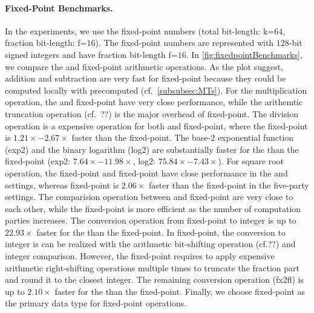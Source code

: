 \paragraph{Fixed-Point Benchmarks.}
\label{para:Fixed-PointBenchmarking}
In the experiments, we use the \booleanGMW fixed-point numbers (total bit-length: k=$64$, fraction bit-length: f=$16$).
The \arithmeticGMW fixed-point numbers are represented with $128$-bit signed integers and have fraction bit-length f=$16$.
In \autoref{fig:fixedpointBenchmarks}, we compare the \booleanGMW and \arithmeticGMW fixed-point arithmetic operations. As the plot suggest, addition and subtraction are very fast for \arithmeticGMW fixed-point because they could be computed locally with precomputed \mts (cf.~\autoref{subsubsec:MTs}). For the multiplication operation, the \booleanGMW and \arithmeticGMW fixed-point have very close performance, while the arithemtic truncation operation (cf.~??) is the major overhead of \arithmeticGMW fixed-point. The division operation is a expensive operation for both \booleanGMW and \arithmeticGMW fixed-point, where the \arithmeticGMW fixed-point is $1.21\times-2.67\times$ faster than the \booleanGMW fixed-point. The base-2 exponential function (exp2) and the binary logarithm (log2) are substantially faster for the \booleanGMW than the \arithmeticGMW fixed-point (exp2: $7.64\times-11.98\times$, log2: $75.84\times-7.43\times$). For square root operation, the \booleanGMW fixed-point and \arithmeticGMW fixed-point have close performance in the \twopc and \threepc settings, whereas \booleanGMW fixed-point is $2.06\times$ faster than the \arithmeticGMW fixed-point in the five-party settings. The comparision operation between \booleanGMW and \arithmeticGMW fixed-point are very close to each other, while the \booleanGMW fixed-point is more efficient as the number of computation parties increases. The conversion operation from fixed-point to integer is up to $22.93\times$ faster for the \booleanGMW than the \arithmeticGMW fixed-point. In \booleanGMW fixed-point, the conversion to integer is can be realized with the arithmetic bit-shifting operation (cf.??) and integer comparison. However, the \arithmeticGMW fixed-point requires to apply expensive arithmetic right-shifting operations multiple times to truncate the fraction part and round it to the closest integer. The remaining conversion operation (fx2fl)  is up to $2.10\times$ faster for the \arithmeticGMW than the \booleanGMW fixed-point.
Finally, we choose \booleanGMW fixed-point as the primary data type for fixed-point operations.


